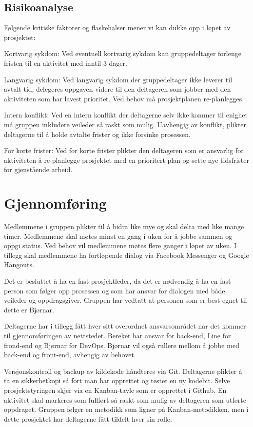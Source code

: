 \documentclass[11pt,a4paper]{report}
\begin{document}
\smallskip

\subsection*{Risikoanalyse}

Følgende kritiske faktorer og flaskehalser mener vi kan dukke opp i løpet av prosjektet:

Kortvarig sykdom: Ved eventuell kortvarig sykdom kan gruppedeltager forlenge fristen til en aktivitet med inntil 3 dager. 

Langvarig sykdom: Ved langvarig sykdom der gruppedeltager ikke leverer til avtalt tid, delegeres oppgaven videre til den deltageren som jobber med den aktiviteten som har lavest prioritet. Ved behov må prosjektplanen re-planlegges.

Intern konflikt: Ved en intern konflikt der deltagerne selv ikke kommer til enighet må gruppen inkludere veileder så raskt som mulig. Uavhengig av konflikt, plikter deltagerne til å holde avtalte frister og ikke forsinke prosessen.

For korte frister: Ved for korte frister plikter den deltageren som er ansvarlig for aktiviteten å re-planlegge prosjektet med en prioritert plan og sette nye tidsfrister for gjenstående arbeid. 

\section*{Gjennomføring}

Medlemmene i gruppen plikter til å bidra like mye og skal delta med like mange timer. Medlemmene skal møtes minst en gang i uken for å jobbe sammen og oppgi status. Ved behov vil medlemmene møtes flere ganger i løpet av uken. I tillegg skal medlemmene ha fortløpende dialog via Facebook Messenger og Google Hangouts.


Det er besluttet å ha en fast prosjektleder, da det er nødvendig å ha en fast person som følger opp prosessen og som har ansvar for dialogen med både veileder og oppdragsgiver. Gruppen har vedtatt at personen som er best egnet til dette er Bjørnar.

Deltagerne har i tillegg fått hver sitt overordnet ansvarsområdet når det kommer til gjennomføringen av nettstedet. Bereket har ansvar for back-end, Line for frond-end og Bjørnar for DevOps. Bjørnar vil også rullere mellom å jobbe med back-end og front-end, avhengig av behovet.

Versjonskontroll og backup av kildekode håndteres via Git. Deltagerne plikter å ta en sikkerhetkopi så fort man har opprettet og testet en ny kodebit. Selve prosjektstyringen skjer via en Kanban-tavle som er opprettet i Github. En aktivitet skal markeres som fullført så raskt som mulig av deltageren som utførte oppdraget. Gruppen følger en metodikk som ligner på Kanban-metodikken, men i dette prosjektet har deltagerne fått tildelt hver sin rolle. 
\end{document}
